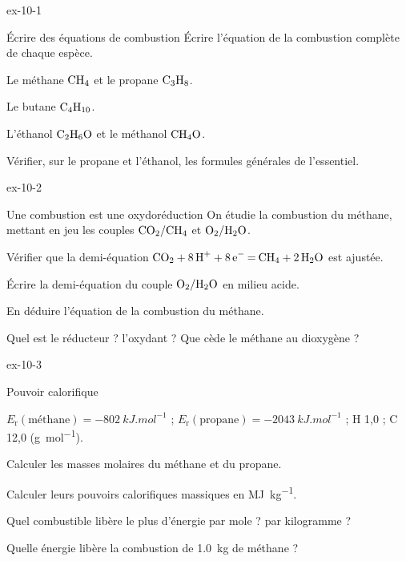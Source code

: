 \begin{blocLivre}{ex-10-1}
\begin{exercice}[1]{Écrire des équations de combustion}
Écrire l'équation de la combustion complète de chaque espèce.
\begin{questions}
\item Le méthane $\ce{CH4}$ et le propane $\ce{C3H8}$.
\item Le butane $\ce{C4H10}$.
\item L'éthanol $\ce{C2H6O}$ et le méthanol $\ce{CH4O}$.
\item Vérifier, sur le propane et l'éthanol, les formules générales de l'essentiel.
\end{questions}
\end{exercice}
\end{blocLivre}
\begin{blocLivre}{ex-10-2}
\begin{exercice}[1]{Une combustion est une oxydoréduction}
On étudie la combustion du méthane, mettant en jeu les couples $\ce{CO2}/\ce{CH4}$ et $\ce{O2}/\ce{H2O}$.
\begin{questions}
\item Vérifier que la demi-équation $\ce{CO2 + 8H+ + 8e- = CH4 + 2H2O}$ est ajustée.
\item Écrire la demi-équation du couple $\ce{O2}/\ce{H2O}$ en milieu acide.
\item En déduire l'équation de la combustion du méthane.
\item Quel est le réducteur ? l'oxydant ? Que cède le méthane au dioxygène ?
\end{questions}
\end{exercice}
\end{blocLivre}
\begin{blocLivre}{ex-10-3}
\begin{exercice}[1]{Pouvoir calorifique}
\begin{donnees}
$E_\mathrm{r}(\text{méthane})=\qty{-802}{kJ.mol^{-1}}$ ; $E_\mathrm{r}(\text{propane})=\qty{-2043}{kJ.mol^{-1}}$ ; H 1,0 ; C 12,0 (\unit{g.mol^{-1}}).
\end{donnees}
\begin{questions}
\item Calculer les masses molaires du méthane et du propane.
\item Calculer leurs pouvoirs calorifiques massiques en \unit{MJ.kg^{-1}}.
\item Quel combustible libère le plus d'énergie par mole ? par kilogramme ?
\item Quelle énergie libère la combustion de \qty{1,0}{kg} de méthane ?
\end{questions}
\end{exercice}
\end{blocLivre}

